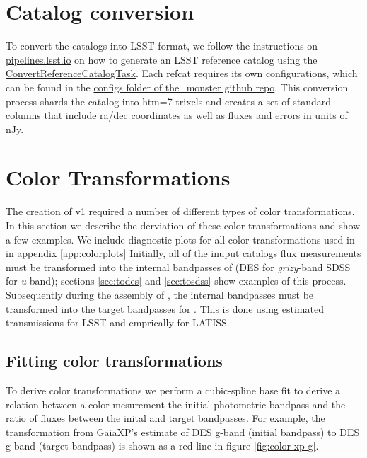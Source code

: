 \section{Catalog conversion}
\label{sec:conversion}
To convert the catalogs into LSST format, we follow the instructions on \href{https://pipelines.lsst.io/modules/lsst.meas.algorithms/creating-a-reference-catalog.html}{pipelines.lsst.io} on how to generate an LSST reference catalog using the \href{https://pipelines.lsst.io/modules/lsst.meas.algorithms/tasks/lsst.meas.algorithms.ConvertReferenceCatalogTask.html#lsst-task-lsst-meas-algorithms-convertreferencecatalog-convertreferencecatalogtask}{ConvertReferenceCatalogTask}. Each refcat requires its own configurations, which can be found in the \href{https://github.com/lsst-dm/the_monster/tree/main/configs}{configs folder of the\_monster github repo}.
This conversion process shards the catalog into htm=7 trixels and creates a set of standard columns that include ra/dec coordinates as well as fluxes and errors in units of nJy.

\section{Color Transformations}
\label{sec:colors}
The creation of \monster v1 required a number of different types of color transformations. 
In this section we describe the derviation of these color transformations and show a few examples. 
We include diagnostic plots for all color transformations used in \monster in appendix \ref{app:colorplots}
Initially, all of the inuput catalogs flux measurements must be transformed into the internal bandpasses of \monster (DES for \emph{grizy}-band SDSS for \emph{u}-band); sections \ref{sec:todes} and \ref{sec:tosdss} show examples of this process. 
Subsequently during the assembly of \monster, the internal bandpasses must be transformed into the target bandpasses for \monster. 
This is done using estimated transmissions for LSST and emprically for LATISS. 


\subsection{Fitting color transformations}
To derive color transformations we perform a cubic-spline base fit to derive a relation between a color mesurement the initial photometric bandpass and the ratio of fluxes between the inital and target bandpasses.
For example, the transformation from GaiaXP's estimate of DES g-band (initial bandpass) to DES g-band (target bandpass) is shown as a red line in figure \ref{fig:color-xp-g}. 

